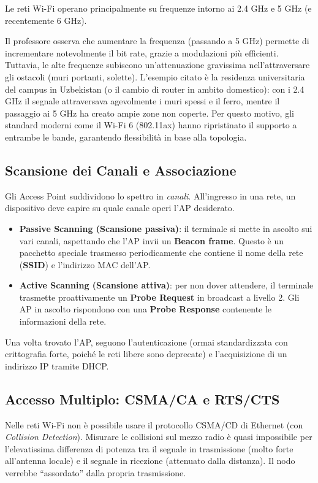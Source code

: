 Le reti Wi-Fi operano principalmente su frequenze intorno ai 2.4 GHz e 5 GHz (e recentemente 6 GHz).
\begin{remark}
Il professore osserva che aumentare la frequenza (passando a 5 GHz) permette di incrementare notevolmente il bit rate, grazie a modulazioni più efficienti. Tuttavia, le alte frequenze subiscono un'attenuazione gravissima nell'attraversare gli ostacoli (muri portanti, solette). L'esempio citato è la residenza universitaria del campus in Uzbekistan (o il cambio di router in ambito domestico): con i 2.4 GHz il segnale attraversava agevolmente i muri spessi e il ferro, mentre il passaggio ai 5 GHz ha creato ampie zone non coperte. Per questo motivo, gli standard moderni come il Wi-Fi 6 (802.11ax) hanno ripristinato il supporto a entrambe le bande, garantendo flessibilità in base alla topologia.
\end{remark}

\subsection{Scansione dei Canali e Associazione}
Gli Access Point suddividono lo spettro in \textit{canali}. All'ingresso in una rete, un dispositivo deve capire su quale canale operi l'AP desiderato.
\begin{itemize}
    \item \textbf{Passive Scanning (Scansione passiva)}: il terminale si mette in ascolto sui vari canali, aspettando che l'AP invii un \textbf{Beacon frame}. Questo è un pacchetto speciale trasmesso periodicamente che contiene il nome della rete (\textbf{SSID}) e l'indirizzo MAC dell'AP.
    \item \textbf{Active Scanning (Scansione attiva)}: per non dover attendere, il terminale trasmette proattivamente un \textbf{Probe Request} in broadcast a livello 2. Gli AP in ascolto rispondono con una \textbf{Probe Response} contenente le informazioni della rete.
\end{itemize}
Una volta trovato l'AP, seguono l'autenticazione (ormai standardizzata con crittografia forte, poiché le reti libere sono deprecate) e l'acquisizione di un indirizzo IP tramite DHCP.

\subsection{Accesso Multiplo: CSMA/CA e RTS/CTS}
Nelle reti Wi-Fi non è possibile usare il protocollo CSMA/CD di Ethernet (con \textit{Collision Detection}). Misurare le collisioni sul mezzo radio è quasi impossibile per l'elevatissima differenza di potenza tra il segnale in trasmissione (molto forte all'antenna locale) e il segnale in ricezione (attenuato dalla distanza). Il nodo verrebbe ``assordato'' dalla propria trasmissione.

